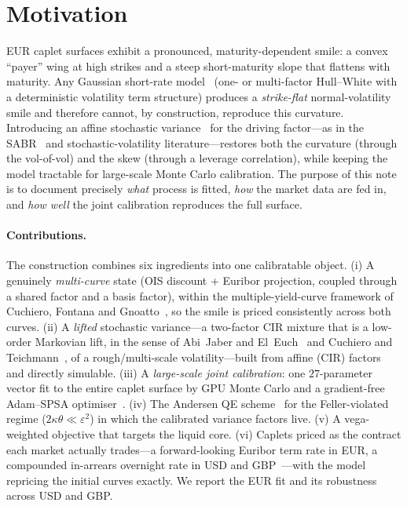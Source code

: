 \documentclass[11pt]{article}
\begin{document}
\section{Motivation}
EUR caplet surfaces exhibit a pronounced, maturity-dependent smile: a
convex ``payer'' wing at high strikes and a steep short-maturity slope that flattens with maturity.
Any Gaussian short-rate model~\cite{vasicek1977,hullwhite1990,brigo2006,filipovic2009} (one- or multi-factor
Hull--White with a deterministic volatility term structure) produces a \emph{strike-flat}
normal-volatility smile and therefore cannot, by construction, reproduce this curvature. Introducing
an affine stochastic variance~\cite{cir1985,heston1993,duffie2000} for the driving
factor---as in the SABR~\cite{hagan2002} and stochastic-volatility literature---restores both the
curvature (through the vol-of-vol) and the skew (through a leverage
correlation), while keeping the model tractable for large-scale Monte Carlo calibration. The
purpose of this note is to document precisely \emph{what} process is fitted, \emph{how} the market
data are fed in, and \emph{how well} the joint calibration reproduces the full surface.

\paragraph{Contributions.} The construction combines six ingredients into one calibratable object.
(i) A genuinely \emph{multi-curve} state (OIS discount + Euribor projection, coupled through a
shared factor and a basis factor), within the multiple-yield-curve framework of Cuchiero, Fontana
and Gnoatto~\cite{fontana2016hjm,cfg2019}, so the smile is priced consistently across both curves.
(ii) A \emph{lifted} stochastic variance---a two-factor CIR mixture that is a low-order Markovian
lift, in the sense of Abi~Jaber and El~Euch~\cite{abijaber2019multi} and
Cuchiero and Teichmann~\cite{cuchiero2019}, of a rough/multi-scale volatility---built from affine (CIR) factors and
directly simulable. (iii) A \emph{large-scale joint calibration}: one \(27\)-parameter vector fit to
the entire caplet surface by GPU Monte Carlo and a gradient-free Adam--SPSA
optimiser~\cite{spall1998,kingma2015}. (iv) The Andersen QE scheme~\cite{andersen2008} for the
Feller-violated regime (\(2\kappa\theta\ll\varepsilon^2\)) in which the calibrated variance factors
live. (v) A vega-weighted objective that targets the liquid core. (vi) Caplets priced as the contract
each market actually trades---a forward-looking Euribor term rate in EUR, a compounded in-arrears
overnight rate in USD and GBP~\cite{lyashenko2019,fontana2023caplet}---with the model repricing the
initial curves exactly. We report the EUR fit and its robustness across USD and GBP.
\end{document}
